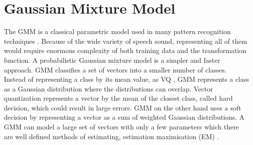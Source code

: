 






\section{Gaussian Mixture Model} %
\label{sec:gaussian_mixture_model}
The GMM is a classical parametric model used in many pattern recognition techniques \cite{stylianou98}. Because of the wide variety of speech sound, representing all of them would require enormous complexity of both training data and the transformation function. A probabilistic Gaussian mixture model is a simpler and faster approach. GMM classifies a set of vectors into a smaller number of classes. Instead of representing a class by its mean value, as VQ \cite{gray84}, GMM represents a class as a Gaussian distribution where the distributions can overlap. Vector quantization represents a vector by the mean of the closest class, called hard decision, which could result in large errors. GMM on the other hand uses a soft decision by representing a vector as a sum of weighted Gaussian distributions. A GMM can model a large set of vectors with only a few parameters which there are well defined methods of estimating, \eg estimation maximisation (EM) \cite{taletek}.

